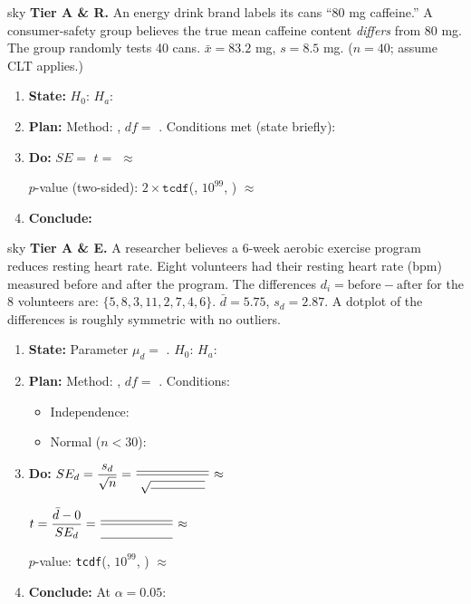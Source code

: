 \documentclass[10pt]{article}
\begin{document}
\begin{scenariobox}{sky}
\textbf{Tier A \& R.} \quad
An energy drink brand labels its cans ``80 mg caffeine.'' A consumer-safety group believes
the true mean caffeine content \emph{differs} from 80 mg. The group randomly tests 40 cans.
$\bar x = 83.2$ mg, $s = 8.5$ mg. ($n = 40$; assume CLT applies.)

\begin{enumerate}[label=\alph*.]
  \item \textbf{State:} $H_0$: \blank{4cm} \quad $H_a$: \blank{4cm}
  \item \textbf{Plan:} Method: \blank{5cm}, $df = $ \blank{1.5cm}. Conditions met (state briefly):
        \writeline
  \item \textbf{Do:} $SE = $ \blank{3cm} \quad $t = $ \blank{4cm} $\approx$ \blank{2cm}

        $p$-value (two-sided): $2 \times \texttt{tcdf}$(\blank{2cm}, $10^{99}$, \blank{2cm}) $\approx$ \blank{2cm}

  \item \textbf{Conclude:} 
\end{enumerate}
\end{scenariobox}

\begin{scenariobox}{sky}
\textbf{Tier A \& E.} \quad
A researcher believes a 6-week aerobic exercise program reduces resting heart rate. Eight
volunteers had their resting heart rate (bpm) measured before and after the program.
The differences $d_i = \text{before} - \text{after}$ for the 8 volunteers are:
$\{5, 8, 3, 11, 2, 7, 4, 6\}$.
$\bar d = 5.75$, $s_d = 2.87$. A dotplot of the differences is roughly symmetric with no outliers.

\begin{enumerate}[label=\alph*.]
  \item \textbf{State:} Parameter $\mu_d = $ \blank{6cm}.
        $H_0$: \blank{3.5cm} \quad $H_a$: \blank{3.5cm}

  \item \textbf{Plan:} Method: \blank{5.5cm}, $df = $ \blank{1.5cm}. Conditions:
        \begin{itemize}
          \item Independence: \writeline
          \item Normal ($n < 30$): \writeline
        \end{itemize}

  \item \textbf{Do:} $SE_d = \dfrac{s_d}{\sqrt{n}} = \dfrac{\blank{2cm}}{\sqrt{\blank{1.5cm}}} \approx$ \blank{2cm}

        $t = \dfrac{\bar d - 0}{SE_d} = \dfrac{\blank{2cm}}{\blank{2cm}} \approx$ \blank{2cm}

        $p$-value: \texttt{tcdf}(\blank{2cm}, $10^{99}$, \blank{2cm}) $\approx$ \blank{2cm}

  \item \textbf{Conclude:} At $\alpha = 0.05$: 
\end{enumerate}
\end{scenariobox}
\end{document}
